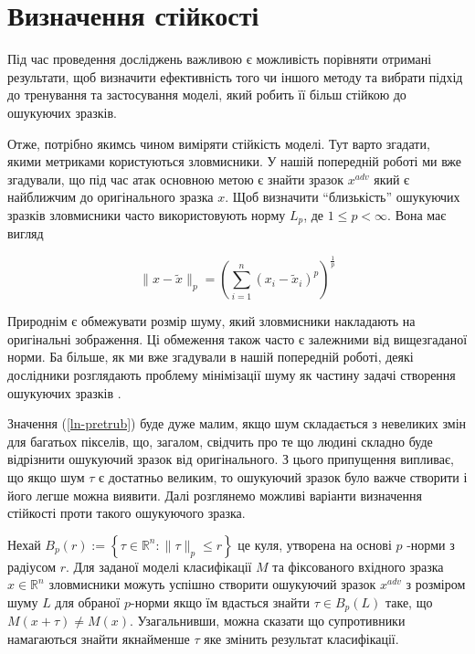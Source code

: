\documentclass[14pt,a4paper]{extarticle}
\newcounter{e}
\numberwithin{equation}{section}
\numberwithin{figure}{section}
\begin{document}
 
 
 \newpage
 \thispagestyle{empty}
 \section{Визначення стійкості}
 \vspace{1cm}
 Під час проведення досліджень важливою є можливість порівняти отримані результати, щоб визначити ефективність того чи іншого методу та вибрати підхід до тренування та застосування моделі, який робить її більш стійкою до ошукуючих зразків.
 
 Отже, потрібно якимсь чином виміряти стійкість моделі. Тут варто згадати, якими метриками користуються зловмисники. У нашій попередній роботі \cite{my-work} ми вже згадували, що під час атак основною метою є знайти зразок $x^{adv}$ який є найближчим до оригінального зразка $x$. Щоб визначити ``близькість'' ошукуючих зразків зловмисники часто використовують норму  $L_p$, де $1 \leq p<\infty$. Вона має вигляд
 
 \begin{equation}
 \label{ln-pretrub}
 \|x-\tilde{x}\|_{p}=\left(\sum_{i=1}^{n}\left(x_{i}-\tilde{x}_{i}\right)^{p}\right)^{\frac{1}{p}}
 \end{equation}
 
 Природнім є обмежувати розмір шуму, який зловмисники накладають на оригінальні зображення. Ці обмеження також часто є залежними від вищезгаданої норми. Ба більше, як ми вже згадували в нашій попередній роботі, деякі дослідники розглядають проблему мінімізації шуму як частину задачі створення ошукуючих зразків \cite{C-and-W}.
 
 Значення (\ref{ln-pretrub}) буде дуже малим, якщо шум складається з невеликих змін для багатьох пікселів, що, загалом, свідчить про те що людині складно буде відрізнити ошукуючий зразок від оригінального. З цього припущення випливає, що якщо шум $\tau$ є достатньо великим, то ошукуючий зразок було важче створити і його легше можна виявити.
 Далі розглянемо можливі варіанти визначення стійкості проти такого ошукуючого зразка.
 
 Нехай $B_{p}(r):=\left\{\tau \in \mathbb{R}^{n}:\|\tau\|_{p} \leq r\right\}$ це куля, утворена на основі $p$ -норми з радіусом $r$. Для заданої моделі класифікації $M$ та фіксованого вхідного зразка $x \in \mathbb{R}^{n}$ зловмисники можуть успішно створити ошукуючий зразок $x^{adv}$ з розміром шуму $L$ для обраної $p$-норми якщо їм вдасться знайти $\tau \in B_{p}(L)$ таке, що $M(x+\tau) \neq M(x)$. Узагальнивши, можна сказати що супротивники намагаються знайти якнайменше $\tau$ яке змінить результат класифікації.
 
\end{document}
